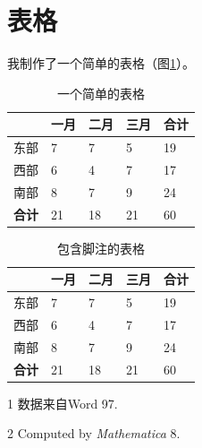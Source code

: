 \documentclass[
    bachelor, 
    ]{xjtuthesis}
\begin{document}
        \section{表格}

            我制作了一个简单的表格（图\ref{tab:simple}）。

            \begin{table}[h!]
              \centering
              \caption{一个简单的表格}
              \label{tab:simple}
              \wuhao
              \begin{tabularx}{\linewidth}{XXXXX} \toprule 
                    & 一月 & 二月 & 三月 & 合计 \\ \midrule
               东部 &    7 &    7 &    5 &   19 \\ 
               西部 &    6 &    4 &    7 &   17 \\ 
               南部 &    8 &    7 &    9 &   24 \\ 
           \bf 合计 &   21 &   18 &   21 &   60 \\ \bottomrule
              \end{tabularx}
            \end{table}


            \begin{table}[h!]
              \begin{threeparttable}[h]
                \centering
                \caption{包含脚注的表格}
                \label{tab:with-footnote}
                \wuhao
                \begin{tabularx}{\linewidth}{XXXXX} \toprule 
                      & 一月 & 二月 & 三月 & 合计 \\ \midrule
                      东部 &    7\tnote{1}
                                    &    7 &    5 &   19 \\ 
                 西部 &    6 &    4 &    7 &   17 \\ 
                 南部 &    8 &    7 &    9 &   24 \\ 
                 \bf 合计\tnote{2}
                      &   21 &   18 &   21 &   60 \\ \bottomrule
                \end{tabularx}
              \begin{tablenotes}
              \item[1] 数据来自Word 97.
              \item[2] Computed by \textsl{Mathematica} 8.
              \end{tablenotes}
              \end{threeparttable}
            \end{table}
\end{document}
